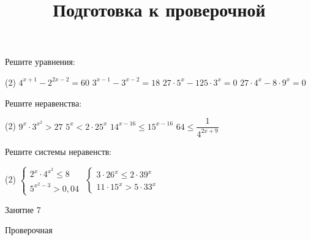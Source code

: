 \begin{homework}[number=3]
	\begin{listofex}
		\item Решите уравнения:
		\begin{tasks}(2)
			\task \( 4^{x+1}-2^{2x-2}=60 \)
			\task \( 3^{x-1}-3^{x-2}=18 \)
			\task \( 27 \cdot 5^x-125 \cdot 3^x=0 \)
			\task \( 27 \cdot 4^x - 8 \cdot 9^x=0 \)
		\end{tasks}
		\item Решите неравенства: %
		\begin{tasks}(2)
			\task \( 9^x \cdot 3^{x^2} > 27 \)
			\task \( 5^x < 2 \cdot 25^x \)
			\task \( 14^{x-16} \le 15^{x-16} \)
			\task \( 64 \le \dfrac{1}{4^{2x+9}} \)
		\end{tasks}
		\item Решите системы неравенств:
		\begin{tasks}(2)
			\task \( \begin{cases} 2^x \cdot 4 ^{x^2} \le 8 \\ 5^{x^2-3} > 0,04 \end{cases} \)
			\task \( \begin{cases} 3 \cdot 26^x \le 2 \cdot 39^x \\ 11 \cdot 15^x > 5 \cdot 33^x \end{cases} \)
		\end{tasks}
	\end{listofex}
\end{homework}
	
\begin{class}[number=7]
	\title{Подготовка к проверочной}
	\begin{listofex}
		\item Занятие 7
	\end{listofex}
\end{class}
	
\begin{exam}
	\begin{listofex}
		\item Проверочная
	\end{listofex}
\end{exam}
